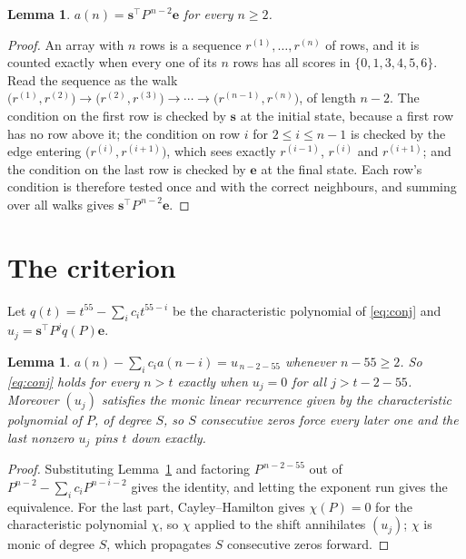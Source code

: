\documentclass[11pt,a4paper]{article}
\theoremstyle{plain}
\newtheorem{lemma}[theorem]{Lemma}
\theoremstyle{definition}
\begin{document}
\begin{lemma}\label{lem:walk}
$a(n)=\mathbf{s}^{\!\top}P^{\,n-2}\mathbf{e}$ for every $n\ge2$.
\end{lemma}

\begin{proof}
An array with $n$ rows is a sequence $r^{(1)},\dots,r^{(n)}$ of rows, and it is counted
exactly when every one of its $n$ rows has all scores in $\{0,1,3,4,5,6\}$. Read the sequence as the
walk $\bigl(r^{(1)},r^{(2)}\bigr)\to\bigl(r^{(2)},r^{(3)}\bigr)\to\cdots\to
\bigl(r^{(n-1)},r^{(n)}\bigr)$, of length $n-2$. The condition on the first row is
checked by $\mathbf{s}$ at the initial state, because a first row has no row above it; the
condition on row $i$ for $2\le i\le n-1$ is checked by the edge entering
$\bigl(r^{(i)},r^{(i+1)}\bigr)$, which sees exactly $r^{(i-1)}$, $r^{(i)}$ and
$r^{(i+1)}$; and the condition on the last row is checked by $\mathbf{e}$ at the final
state. Each row's condition is therefore tested once and with the correct neighbours, and
summing over all walks gives $\mathbf{s}^{\!\top}P^{\,n-2}\mathbf{e}$.
\end{proof}

\section{The criterion}

Let $q(t)=t^{55}-\sum_i c_i t^{55-i}$ be the characteristic polynomial of
\eqref{eq:conj} and $u_j=\mathbf{s}^{\!\top}P^{j}q(P)\mathbf{e}$.

\begin{lemma}\label{lem:crit}
$a(n)-\sum_i c_i a(n-i)=u_{\,n-2-55}$ whenever $n-55\ge2$. So \eqref{eq:conj}
holds for every $n>t$ exactly when $u_j=0$ for all $j>t-2-55$. Moreover $(u_j)$
satisfies the monic linear recurrence given by the characteristic polynomial of $P$, of
degree $S$, so $S$ consecutive zeros force every later one and the last nonzero $u_j$ pins
$t$ down exactly.
\end{lemma}

\begin{proof}
Substituting Lemma~\ref{lem:walk} and factoring $P^{\,n-2-55}$ out of
$P^{n-2}-\sum_i c_i P^{n-i-2}$ gives the identity, and letting the exponent run gives the
equivalence. For the last part, Cayley--Hamilton gives $\chi(P)=0$ for the characteristic
polynomial $\chi$, so $\chi$ applied to the shift annihilates $(u_j)$; $\chi$ is monic of
degree $S$, which propagates $S$ consecutive zeros forward.
\end{proof}
\end{document}
